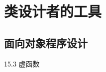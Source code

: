 \documentclass{article}
\begin{document}
\section{类设计者的工具}
\subsection{面向对象程序设计}



15.3 虚函数
\end{document}
